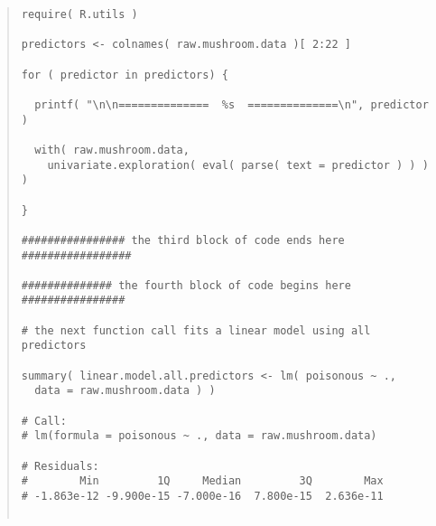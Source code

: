 \documentclass[12pt]{article}
\begin{document}
\begin{quote}
\begin{verbatim}
require( R.utils )

predictors <- colnames( raw.mushroom.data )[ 2:22 ]

for ( predictor in predictors) {

  printf( "\n\n==============  %s  ==============\n", predictor )

  with( raw.mushroom.data, 
    univariate.exploration( eval( parse( text = predictor ) ) ) )

}

################ the third block of code ends here #################

############## the fourth block of code begins here ################

# the next function call fits a linear model using all predictors

summary( linear.model.all.predictors <- lm( poisonous ~ ., 
  data = raw.mushroom.data ) )

# Call:
# lm(formula = poisonous ~ ., data = raw.mushroom.data)

# Residuals:
#        Min         1Q     Median         3Q        Max 
# -1.863e-12 -9.900e-15 -7.000e-16  7.800e-15  2.636e-11 


\end{verbatim}
\end{quote}
\end{document}
